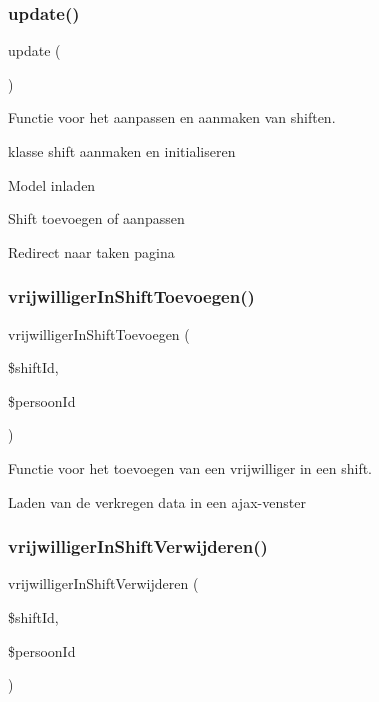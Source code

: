 \subsubsection{\texorpdfstring{update()}{update()}}
{\footnotesize\ttfamily update (\begin{DoxyParamCaption}{ }\end{DoxyParamCaption})}



Functie voor het aanpassen en aanmaken van shiften. 

klasse shift aanmaken en initialiseren

Model inladen

Shift toevoegen of aanpassen

Redirect naar taken pagina \mbox{\label{class_shiften_ab799250126ff159fd1ca9e896a57bcb6}} 
\subsubsection{\texorpdfstring{vrijwilliger\+In\+Shift\+Toevoegen()}{vrijwilligerInShiftToevoegen()}}
{\footnotesize\ttfamily vrijwilliger\+In\+Shift\+Toevoegen (\begin{DoxyParamCaption}\item[{}]{\$shift\+Id,  }\item[{}]{\$persoon\+Id }\end{DoxyParamCaption})}



Functie voor het toevoegen van een vrijwilliger in een shift. 

Laden van de verkregen data in een ajax-\/venster \mbox{\label{class_shiften_acd0ea5b1f1b5ef6ee363916d98a261cb}} 
\subsubsection{\texorpdfstring{vrijwilliger\+In\+Shift\+Verwijderen()}{vrijwilligerInShiftVerwijderen()}}
{\footnotesize\ttfamily vrijwilliger\+In\+Shift\+Verwijderen (\begin{DoxyParamCaption}\item[{}]{\$shift\+Id,  }\item[{}]{\$persoon\+Id }\end{DoxyParamCaption})}



